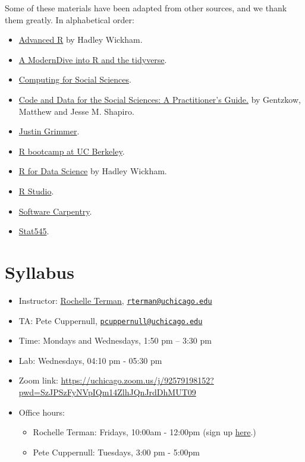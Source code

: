 \documentclass[]{book}
\providecommand{\tightlist}{%
  \setlength{\itemsep}{0pt}\setlength{\parskip}{0pt}}
\begin{document}
Some of these materials have been adapted from other sources, and we
thank them greatly. In alphabetical order:

\begin{itemize}
\tightlist
\item
  \href{https://adv-r.hadley.nz/}{Advanced R} by Hadley Wickham.
\item
  \href{https://moderndive.netlify.com/1-getting-started.html}{A
  ModernDive into R and the tidyverse}.
\item
  \href{https://cfss.uchicago.edu}{Computing for Social Sciences}.
\item
  \href{https://web.stanford.edu/~gentzkow/research/CodeAndData.pdf}{Code
  and Data for the Social Sciences: A Practitioner's Guide.} by
  Gentzkow, Matthew and Jesse M. Shapiro.
\item
  \href{https://www.justingrimmer.org/}{Justin Grimmer}.
\item
  \href{https://github.com/berkeley-scf/r-bootcamp-fall-2019}{R bootcamp
  at UC Berkeley}.
\item
  \href{https://r4ds.had.co.nz/}{R for Data Science} by Hadley Wickham.
\item
  \href{https://support.rstudio.com/hc/en-us/articles/200484448}{R
  Studio}.
\item
  \href{http://swcarpentry.github.io/r-novice-gapminder/}{Software
  Carpentry}.
\item
  \href{https://stat545.com/}{Stat545}.
\end{itemize}

\chapter{Syllabus}\label{syllabus}

\begin{itemize}
\item
  Instructor: \href{http://rochelleterman.com/}{Rochelle Terman},
  \href{mailto:rterman@uchicago.edu}{\nolinkurl{rterman@uchicago.edu}}
\item
  TA: Pete Cuppernull,
  \href{mailto:pcuppernull@uchicago.edu}{\nolinkurl{pcuppernull@uchicago.edu}}
\item
  Time: Mondays and Wednesdays, 1:50 pm -- 3:30 pm
\item
  Lab: Wednesdays, 04:10 pm - 05:30 pm
\item
  Zoom link:
  \url{https://uchicago.zoom.us/j/92579198152?pwd=SzJPSzFyNVpIQm14ZlhJQnJrdDhMUT09}
\item
  Office hours:

  \begin{itemize}
  \tightlist
  \item
    Rochelle Terman: Fridays, 10:00am - 12:00pm (sign up
    \href{https://calendar.google.com/calendar/u/0/selfsched?sstoken=UU15RV92YzJrVDNDfGRlZmF1bHR8NjcyM2ZhMGM4ODIwMGIxYTZmYjdmZDE1NzhiOGM0OGI}{here}.)
  \item
    Pete Cuppernull: Tuesdays, 3:00 pm - 5:00pm
  \end{itemize}
\end{itemize}
\end{document}
